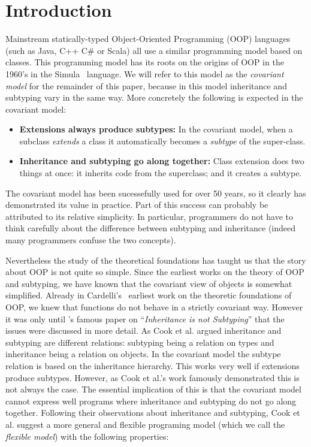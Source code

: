 \section{Introduction}
\label{sec:intro}

Mainstream statically-typed Object-Oriented Programming (OOP) languages (such as Java,
C++ C\# or Scala) all use a similar programming model based on
classes. This programming model has its roots on the
origins of OOP in the 1960's in the Simula~\cite{dahl1967simula} language.
We will refer to this model as the \emph{covariant model} for the
remainder of this paper, because in this model inheritance and
subtyping vary in the same way. More concretely
the following is expected in the covariant model:

\begin{itemize}

\item {\bf Extensions always produce subtypes:} In the covariant model, when a 
subclass \emph{extends} a class it automatically becomes a 
\emph{subtype} of the super-class. 

\item{\bf Inheritance and subtyping go along together:}
Class extension does two things at once: it inherits code from the
superclass; and it creates a subtype. 

\end{itemize}

The covariant model has been sucessefully used for over 50 years,
so it clearly has demonstrated its value in practice. 
Part of this success can probably be attributed 
to its relative simplicity. In particular, programmers do not have to think carefully 
about the difference between subtyping and inheritance (indeed many
programmers confuse the two concepts). 

Nevertheless the study of the theoretical foundations has
taught us that the story about OOP is not quite so simple. Since the
earliest works on the theory of OOP and subtyping, we have known that 
the covariant view of objects is somewhat simplified. Already in
Cardelli's~\cite{} earliest work on the theoretic foundations of OOP,
we knew that functions do not behave in a strictly covariant way. 
However it was only until \citet{cook1989inheritance}'s famous paper on
``\emph{Inheritance is not Subtyping}'' that the issues were discussed 
in more detail. As Cook et al. argued inheritance and
subtyping are different relations: subtyping being a relation on types 
and inheritance being a relation on objects. In the covariant model 
the subtype relation is based on the inheritance hierarchy. This 
works very well if extensions produce 
subtypes. However, as Cook et al.'s work famously demonstrated 
this is not always the case. The essential implication of this is that
the covariant model cannot express well programs where inheritance 
and subtyping do not go along together. Following their observations about 
inheritance and subtyping, Cook et al. suggest a more general and 
flexible programing model (which we call the \emph{flexible model}) with the following properties:

